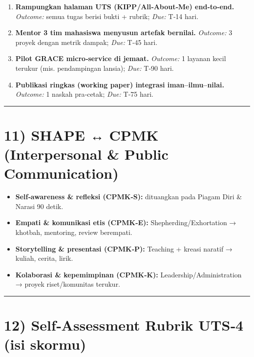 \documentclass[
  letterpaper,
  DIV=11,
  numbers=noendperiod]{scrreprt}
\providecommand{\tightlist}{%
  \setlength{\itemsep}{0pt}\setlength{\parskip}{0pt}}\usepackage{longtable,booktabs,array}
\begin{document}
\begin{enumerate}
\def\labelenumi{\arabic{enumi}.}
\tightlist
\item
  \textbf{Rampungkan halaman UTS (KIPP/All‑About‑Me) end‑to‑end.}
  \emph{Outcome:} semua tugas berisi bukti + rubrik; \emph{Due:} T‑14
  hari.
\item
  \textbf{Mentor 3 tim mahasiswa menyusun artefak bernilai.}
  \emph{Outcome:} 3 proyek dengan metrik dampak; \emph{Due:} T‑45 hari.
\item
  \textbf{Pilot GRACE micro‑service di jemaat.} \emph{Outcome:} 1
  layanan kecil terukur (mis. pendampingan lansia); \emph{Due:} T‑90
  hari.
\item
  \textbf{Publikasi ringkas (working paper) integrasi
  iman--ilmu--nilai.} \emph{Outcome:} 1 naskah pra‑cetak; \emph{Due:}
  T‑75 hari.
\end{enumerate}

\begin{center}\rule{0.5\linewidth}{0.5pt}\end{center}

\section{11) SHAPE ↔ CPMK (Interpersonal \& Public
Communication)}\label{shape-cpmk-interpersonal-public-communication}

\begin{itemize}
\tightlist
\item
  \textbf{Self‑awareness \& refleksi (CPMK‑S):} dituangkan pada Piagam
  Diri \& Narasi 90 detik.
\item
  \textbf{Empati \& komunikasi etis (CPMK‑E):} Shepherding/Exhortation →
  khotbah, mentoring, review berempati.
\item
  \textbf{Storytelling \& presentasi (CPMK‑P):} Teaching + kreasi
  naratif → kuliah, cerita, lirik.
\item
  \textbf{Kolaborasi \& kepemimpinan (CPMK‑K):}
  Leadership/Administration → proyek riset/komunitas terukur.
\end{itemize}

\begin{center}\rule{0.5\linewidth}{0.5pt}\end{center}

\section{12) Self‑Assessment Rubrik UTS‑4 (isi
skormu)}\label{selfassessment-rubrik-uts4-isi-skormu}
\end{document}
